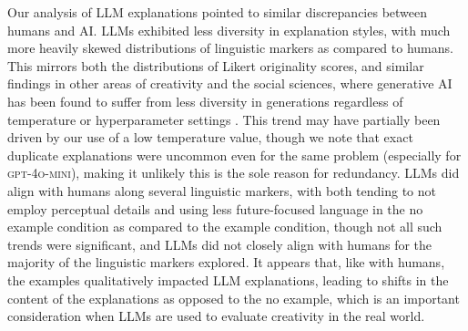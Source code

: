 Our analysis of LLM explanations pointed to similar discrepancies between humans and AI. LLMs exhibited less diversity in explanation styles, with much more heavily skewed distributions of linguistic markers as compared to humans. This mirrors both the distributions of Likert originality scores, and similar findings in other areas of creativity and the social sciences, where generative AI has been found to suffer from less diversity in generations regardless of temperature or hyperparameter settings \citep{park2024diminished}. This trend may have partially been driven by our use of a low temperature value, though we note that exact duplicate explanations were uncommon even for the same problem (especially for \textsc{gpt-4o-mini}), making it unlikely this is the sole reason for redundancy. LLMs did align with humans along several linguistic markers, with both tending to not employ perceptual details and using less future-focused language in the no example condition as compared to the example condition, though not all such trends were significant, and LLMs did not closely align with humans for the majority of the linguistic markers explored. It appears that, like with humans, the examples qualitatively impacted LLM explanations, leading to shifts in the content of the explanations as opposed to the no example, which is an important consideration when LLMs are used to evaluate creativity in the real world.



